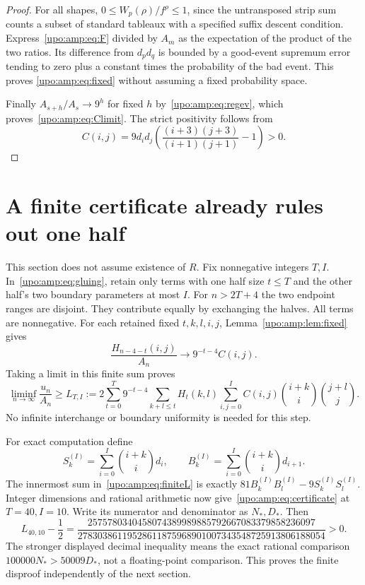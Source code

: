 \documentclass[11pt,letterpaper]{article}
\theoremstyle{remark}\newtheorem{remark}[theorem]{Remark}
\numberwithin{equation}{section}
\begin{document}
\begin{proof}
For all shapes, $0\le W_p(\rho)/f^\rho\le1$, since the untransposed
strip sum counts a subset of standard tableaux with a specified suffix
descent condition. Express~\eqref{upo:amp:eq:F} divided by $A_m$ as the
expectation of the product of the two ratios. Its difference from
$d_pd_q$ is bounded by a good-event supremum error tending to zero plus
a constant times the probability of the bad event. This proves
\eqref{upo:amp:eq:fixed} without assuming a fixed probability space.

Finally $A_{s+h}/A_s\to9^h$ for fixed $h$ by~\eqref{upo:amp:eq:regev}, which
proves~\eqref{upo:amp:eq:Climit}. The strict positivity follows from
\begin{equation}\label{upo:amp:eq:Cpositive}
C(i,j)=9d_id_j
\left(\frac{(i+3)(j+3)}{(i+1)(j+1)}-1\right)>0.
\end{equation}
\end{proof}

\section{A finite certificate already rules out one half}\label{upo:amp:sec:certificate}
This section does not assume existence of $R$. Fix nonnegative integers
$T,I$. In~\eqref{upo:amp:eq:gluing}, retain only terms with one half size $t\le T$
and the other half's two boundary parameters at most $I$. For
$n>2T+4$ the two endpoint ranges are disjoint. They contribute equally
by exchanging the halves. All terms are nonnegative. For each retained
fixed $t,k,l,i,j$, Lemma~\ref{upo:amp:lem:fixed} gives
\[
\frac{H_{n-4-t}(i,j)}{A_n}\longrightarrow9^{-t-4}C(i,j).
\]
Taking a limit in this finite sum proves
\begin{equation}\label{upo:amp:eq:finiteL}
\liminf_{n\to\infty}\frac{u_n}{A_n}\ge L_{T,I}:=
2\sum_{t=0}^{T}9^{-t-4}
\sum_{k+l\le t}H_t(k,l)
\sum_{i,j=0}^{I}C(i,j)\binom{i+k}{i}\binom{j+l}{j}.
\end{equation}
No infinite interchange or boundary uniformity is needed for this step.

For exact computation define
\[
S_k^{(I)}=\sum_{i=0}^{I}\binom{i+k}{i}d_i,
\qquad B_k^{(I)}=\sum_{i=0}^{I}\binom{i+k}{i}d_{i+1}.
\]
The innermost sum in~\eqref{upo:amp:eq:finiteL} is exactly
$81B_k^{(I)}B_l^{(I)}-9S_k^{(I)}S_l^{(I)}$.
Integer dimensions and rational arithmetic now give~\eqref{upo:amp:eq:certificate}
at $T=40,I=10$. Write its numerator and denominator as $N_*,D_*$. Then
\begin{equation}\label{upo:amp:eq:gap}
L_{40,10}-\frac12=
\frac{2575780340458074389989885792667083379858236097}
{27830386119528611875968901007343548725913806188054}>0.
\end{equation}
The stronger displayed decimal inequality means the exact rational
comparison $100000N_*>50009D_*$, not a floating-point comparison.
This proves the finite disproof independently of the next section.
\end{document}
